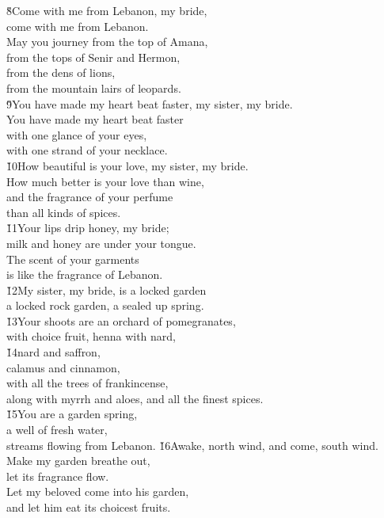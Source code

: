 \begin{poetry}
\poeml \v{8}Come with me from Lebanon, my bride, \\
\poemll    come with me from Lebanon. \\
\poeml May you journey from the top of Amana, \\
\poemll    from the tops of Senir and Hermon, \\
\poeml from the dens of lions, \\
\poemll    from the mountain lairs of leopards. \\
\poeml \v{9}You have made my heart beat faster, my sister, my bride. \\
\poemll    You have made my heart beat faster \\
\poemlll       with one glance of your eyes, \\
\poemll    with one strand of your necklace. \\
\poeml \v{10}How beautiful is your love, my sister, my bride. \\
\poemll    How much better is your love than wine, \\
\poeml and the fragrance of your perfume \\
\poemll    than all kinds of spices. \\
\poeml \v{11}Your lips drip honey, my bride; \\
\poemll    milk and honey are under your tongue. \\
\poeml The scent of your garments \\
\poemll    is like the fragrance of Lebanon. \\
\poeml \v{12}My sister, my bride, is a locked garden \\
\poemll    a locked rock garden, a sealed up spring. \\
\poeml \v{13}Your shoots are an orchard of pomegranates, \\
\poemll    with choice fruit, henna with nard, \\
\poeml \v{14}nard and saffron, \\
\poemll    calamus and cinnamon, \\
\poeml with all the trees of frankincense, \\
\poemll    along with myrrh and aloes, and all the finest spices. \\
\poeml \v{15}You are a garden spring, \\
\poemll    a well of fresh water, \\
\poemlll       streams flowing from Lebanon.
\poeml \v{16}Awake, north wind, and come, south wind. \\
\poemll    Make my garden breathe out, \\
\poemlll       let its fragrance flow. \\
\poeml Let my beloved come into his garden, \\
\poemll    and let him eat its choicest fruits.
\end{poetry}
